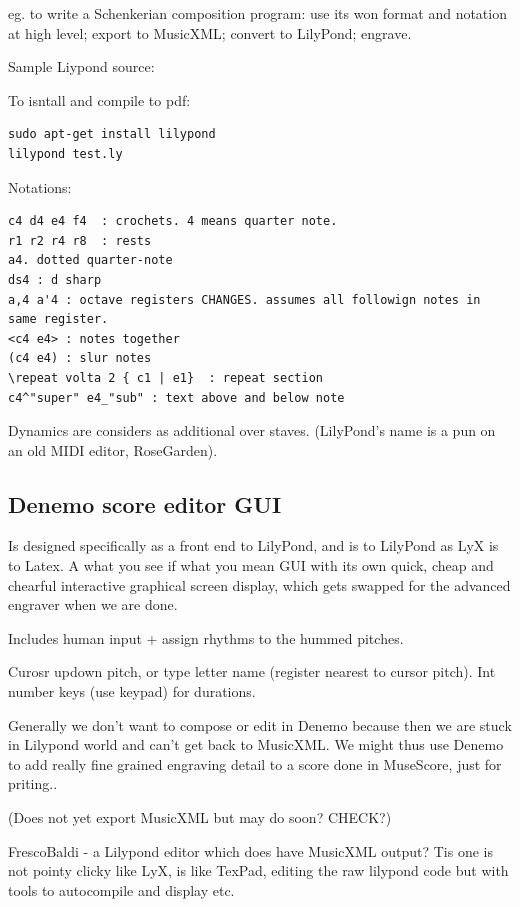 \documentclass[oneside,english]{scrbook}
\begin{document}
eg. to write a Schenkerian composition program: use its won format and notation at high level; export to MusicXML; convert to LilyPond; engrave.

Sample Liypond source:


To isntall and compile to pdf:

\begin{lstlisting}
sudo apt-get install lilypond
lilypond test.ly
\end{lstlisting}

Notations:
\begin{lstlisting}
c4 d4 e4 f4  : crochets. 4 means quarter note.
r1 r2 r4 r8  : rests
a4. dotted quarter-note
ds4 : d sharp
a,4 a'4 : octave registers CHANGES. assumes all followign notes in same register.
<c4 e4> : notes together
(c4 e4) : slur notes
\repeat volta 2 { c1 | e1}  : repeat section
c4^"super" e4_"sub" : text above and below note 
\end{lstlisting}

Dynamics are considers as additional over staves.  (LilyPond's name is a pun on an old MIDI editor, RoseGarden).

\subsection{Denemo score editor GUI}
Is designed specifically as a front end to LilyPond, and is to LilyPond as LyX is to Latex.  A what you see if what you mean GUI with its own quick, cheap and chearful interactive graphical screen display, which gets swapped for the advanced engraver when we are done.

Includes human input + assign rhythms to the hummed pitches.

Curosr updown pitch, or type letter name (register nearest to cursor pitch).  Int number keys (use keypad) for durations.

Generally we don't want to compose or edit in Denemo because then we are stuck in Lilypond world and can't get back to MusicXML.  We might thus use Denemo to add really fine grained engraving detail to a score done in MuseScore, just for priting..

(Does not yet export MusicXML but may do soon? CHECK?)

FrescoBaldi - a Lilypond editor which does have MusicXML output? Tis one is not pointy clicky like LyX, is like TexPad, editing the raw lilypond code but with tools to autocompile and display etc.
\end{document}
